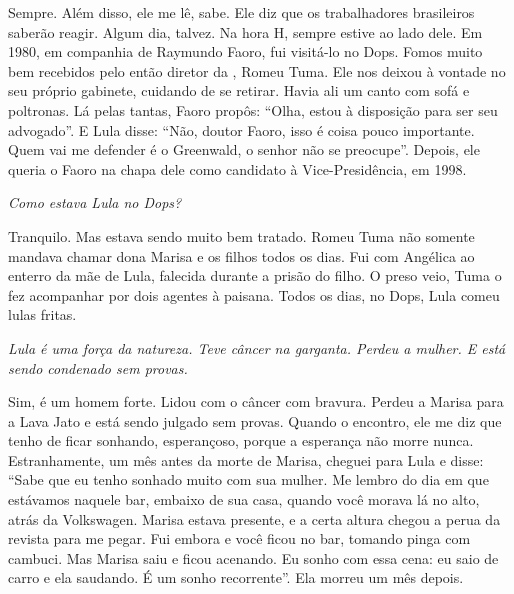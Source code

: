 \normalfont
Sempre. Além disso, ele me lê, sabe. Ele diz que os
trabalhadores brasileiros saberão reagir. Algum dia, talvez. Na hora H,
sempre estive ao lado dele. Em 1980, em companhia de Raymundo Faoro, fui
visitá-lo no Dops. Fomos muito bem recebidos pelo então diretor da ,
Romeu Tuma. Ele nos deixou à vontade no seu próprio gabinete, cuidando
de se retirar. Havia ali um canto com sofá e poltronas. Lá pelas tantas,
Faoro propôs: ``Olha, estou à disposição para ser seu advogado''. E Lula
disse: ``Não, doutor Faoro, isso é coisa pouco importante. Quem vai me
defender é o Greenwald, o senhor não se preocupe''. Depois, ele queria o
Faoro na chapa dele como candidato à Vice-Presidência, em 1998.

\itshape
 Como estava Lula no Dops?

\normalfont
Tranquilo. Mas estava sendo muito bem tratado. Romeu Tuma
não somente mandava chamar dona Marisa e os filhos todos os dias. Fui
com Angélica ao enterro da mãe de Lula, falecida durante a prisão do
filho. O preso veio, Tuma o fez acompanhar por dois agentes à paisana.
Todos os dias, no Dops, Lula comeu lulas fritas.

\itshape
 Lula é uma força da natureza. Teve câncer na garganta.
Perdeu a mulher. E está sendo condenado sem provas.

\normalfont
Sim, é um homem forte. Lidou com o câncer com bravura.
Perdeu a Marisa para a Lava Jato e está sendo julgado sem provas. Quando
o encontro, ele me diz que tenho de ficar sonhando, esperançoso, porque
a esperança não morre nunca. Estranhamente, um mês antes da morte de
Marisa, cheguei para Lula e disse: ``Sabe que eu tenho sonhado muito com
sua mulher. Me lembro do dia em que estávamos naquele bar, embaixo de
sua casa, quando você morava lá no alto, atrás da Volkswagen. Marisa
estava presente, e a certa altura chegou a perua da revista para me
pegar. Fui embora e você ficou no bar, tomando pinga com cambuci. Mas
Marisa saiu e ficou acenando. Eu sonho com essa cena: eu saio de carro e
ela saudando. É um sonho recorrente''. Ela morreu um mês depois.
